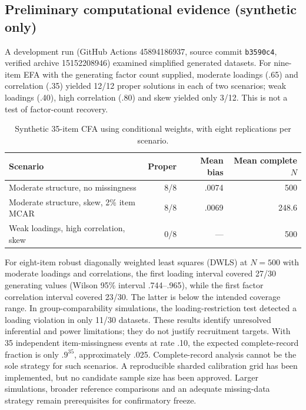 \subsection{Preliminary computational evidence (synthetic only)}
A development run (GitHub Actions 45894186937, source commit \texttt{b3590c4}, verified archive 15152208946) examined simplified generated datasets. For nine-item EFA with the generating factor count supplied, moderate loadings (.65) and correlation (.35) yielded 12/12 proper solutions in each of two scenarios; weak loadings (.40), high correlation (.80) and skew yielded only 3/12. This is not a test of factor-count recovery.

\begin{table}[ht]
\centering\small
\caption{Synthetic 35-item CFA using conditional weights, with eight replications per scenario.}
\begin{tabularx}{\linewidth}{Xrrr}
\toprule
Scenario & Proper & Mean bias & Mean complete $N$\\
\midrule
Moderate structure, no missingness & 8/8 & .0074 & 500\\
Moderate structure, skew, 2\% item MCAR & 8/8 & .0069 & 248.6\\
Weak loadings, high correlation, skew & 0/8 & --- & 500\\
\bottomrule
\end{tabularx}
\end{table}

For eight-item robust diagonally weighted least squares (DWLS) at $N=500$ with moderate loadings and correlations, the first loading interval covered 27/30 generating values (Wilson 95\% interval .744--.965), while the first factor correlation interval covered 23/30. The latter is below the intended coverage range. In group-comparability simulations, the loading-restriction test detected a loading violation in only 11/30 datasets. These results identify unresolved inferential and power limitations; they do not justify recruitment targets. With 35 independent item-missingness events at rate .10, the expected complete-record fraction is only $.9^{35}$, approximately .025. Complete-record analysis cannot be the sole strategy for such scenarios. A reproducible sharded calibration grid has been implemented, but no candidate sample size has been approved. Larger simulations, broader reference comparisons and an adequate missing-data strategy remain prerequisites for confirmatory freeze.


